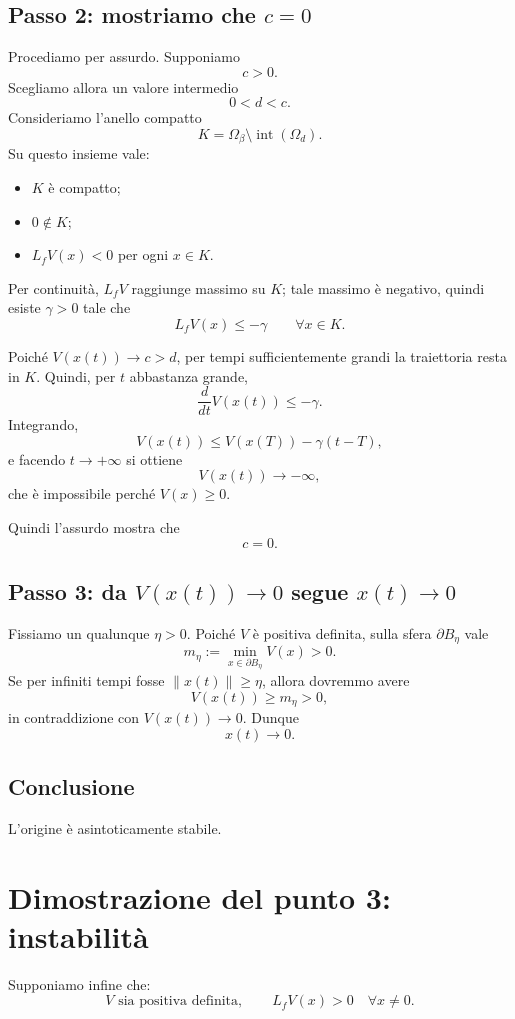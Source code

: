 \subsection*{Passo 2: mostriamo che \(c=0\)}
Procediamo per assurdo. Supponiamo
\[
c>0.
\]
Scegliamo allora un valore intermedio
\[
0<d<c.
\]
Consideriamo l'anello compatto
\[
K=\Omega_\beta \setminus \operatorname{int}(\Omega_d).
\]
Su questo insieme vale:
\begin{itemize}
    \item \(K\) è compatto;
    \item \(0\notin K\);
    \item \(L_fV(x)<0\) per ogni \(x\in K\).
\end{itemize}
Per continuità, \(L_fV\) raggiunge massimo su \(K\); tale massimo è negativo, quindi esiste \(\gamma>0\) tale che
\[
L_fV(x)\le -\gamma
\qquad \forall x\in K.
\]

Poiché \(V(x(t))\to c>d\), per tempi sufficientemente grandi la traiettoria resta in \(K\). Quindi, per \(t\) abbastanza grande,
\[
\frac{d}{dt}V(x(t)) \le -\gamma.
\]
Integrando,
\[
V(x(t)) \le V(x(T))-\gamma(t-T),
\]
e facendo \(t\to+\infty\) si ottiene
\[
V(x(t))\to -\infty,
\]
che è impossibile perché \(V(x)\ge 0\).

Quindi l'assurdo mostra che
\[
c=0.
\]

\subsection*{Passo 3: da \(V(x(t))\to 0\) segue \(x(t)\to 0\)}
Fissiamo un qualunque \(\eta>0\).  
Poiché \(V\) è positiva definita, sulla sfera \(\partial B_\eta\) vale
\[
m_\eta := \min_{x\in \partial B_\eta}V(x) >0.
\]
Se per infiniti tempi fosse \(\|x(t)\|\ge \eta\), allora dovremmo avere
\[
V(x(t))\ge m_\eta >0,
\]
in contraddizione con \(V(x(t))\to 0\). Dunque
\[
x(t)\to 0.
\]

\subsection*{Conclusione}
L'origine è asintoticamente stabile.

\section{Dimostrazione del punto 3: instabilità}

Supponiamo infine che:
\[
V \text{ sia positiva definita},
\qquad
L_fV(x)>0 \quad \forall x\neq 0.
\]

